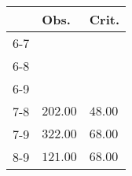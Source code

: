 \begin{table}[ht]
\centering
\begin{tabular}{rll}
  \hline
 & Obs. & Crit. \\ 
  \hline
6-7 &  &  \\ 
  6-8 &  &  \\ 
  6-9 &  &  \\ 
  7-8 & \(\mathbf{202.00}\) & \(\mathbf{48.00}\) \\ 
  7-9 & \(\mathbf{322.00}\) & \(\mathbf{68.00}\) \\ 
  8-9 & \(\mathbf{121.00}\) & \(\mathbf{68.00}\) \\ 
   \hline
\end{tabular}
\end{table}
